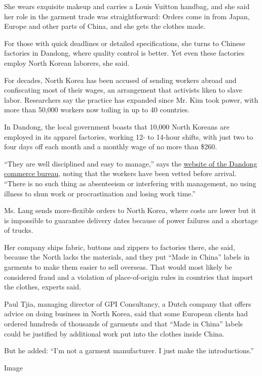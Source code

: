 She wears exquisite makeup and carries a Louis Vuitton handbag, and she
said her role in the garment trade was straightforward: Orders come in
from Japan, Europe and other parts of China, and she gets the clothes
made.

For those with quick deadlines or detailed specifications, she turns to
Chinese factories in Dandong, where quality control is better. Yet even
these factories employ North Korean laborers, she said.

For decades, North Korea has been accused of sending workers abroad and
confiscating most of their wages, an arrangement that activists liken to
slave labor. Researchers say the practice has expanded since Mr. Kim
took power, with more than 50,000 workers now toiling in up to 40
countries.

In Dandong, the local government boasts that 10,000 North Koreans are
employed in its apparel factories, working 12- to 14-hour shifts, with
just two to four days off each month and a monthly wage of no more than
\$260.

``They are well disciplined and easy to manage,'' says the
\href{http://zhaoshang.dandong.gov.cn/html/80/20172/a9b7ba70783b617e9998dc4dd82eb3c5.html}{website
of the Dandong commerce bureau}, noting that the workers have been
vetted before arrival. ``There is no such thing as absenteeism or
interfering with management, no using illness to shun work or
procrastination and losing work time.''

Ms. Lang sends more-flexible orders to North Korea, where costs are
lower but it is impossible to guarantee delivery dates because of power
failures and a shortage of trucks.

Her company ships fabric, buttons and zippers to factories there, she
said, because the North lacks the materials, and they put ``Made in
China'' labels in garments to make them easier to sell overseas. That
would most likely be considered fraud and a violation of place-of-origin
rules in countries that import the clothes, experts said.

Paul Tjia, managing director of GPI Consultancy, a Dutch company that
offers advice on doing business in North Korea, said that some European
clients had ordered hundreds of thousands of garments and that ``Made in
China'' labels could be justified by additional work put into the
clothes inside China.

But he added: ``I'm not a garment manufacturer. I just make the
introductions.''

Image

